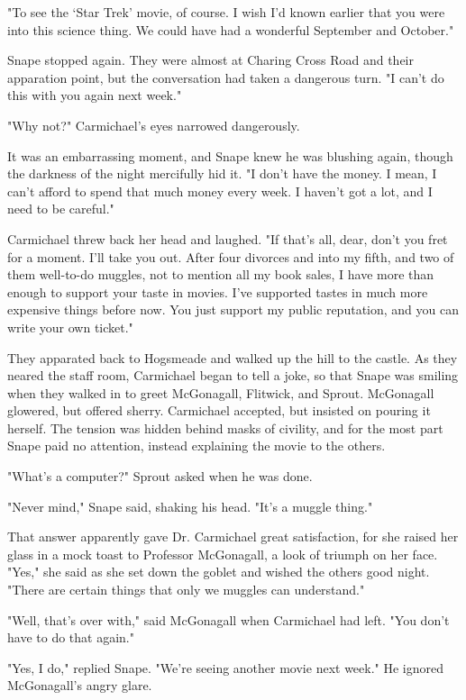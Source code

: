 \documentclass[a4paper,11pt]{article}
\begin{document}
"To see the `Star Trek' movie, of course. I wish I'd known earlier that you were into this science thing. We could have had a wonderful September and October."

Snape stopped again. They were almost at Charing Cross Road and their apparation point, but the conversation had taken a dangerous turn. "I can't do this with you again next week."

"Why not?" Carmichael's eyes narrowed dangerously.

It was an embarrassing moment, and Snape knew he was blushing again, though the darkness of the night mercifully hid it. "I don't have the money. I mean, I can't afford to spend that much money every week. I haven't got a lot, and I need to be careful."

Carmichael threw back her head and laughed. "If that's all, dear, don't you fret for a moment. I'll take you out. After four divorces and into my fifth, and two of them well-to-do muggles, not to mention all my book sales, I have more than enough to support your taste in movies. I've supported tastes in much more expensive things before now. You just support my public reputation, and you can write your own ticket."

They apparated back to Hogsmeade and walked up the hill to the castle. As they neared the staff room, Carmichael began to tell a joke, so that Snape was smiling when they walked in to greet McGonagall, Flitwick, and Sprout. McGonagall glowered, but offered sherry. Carmichael accepted, but insisted on pouring it herself. The tension was hidden behind masks of civility, and for the most part Snape paid no attention, instead explaining the movie to the others.

"What's a computer?" Sprout asked when he was done.

"Never mind," Snape said, shaking his head. "It's a muggle thing."

That answer apparently gave Dr. Carmichael great satisfaction, for she raised her glass in a mock toast to Professor McGonagall, a look of triumph on her face. "Yes," she said as she set down the goblet and wished the others good night. "There are certain things that only we muggles can understand."

"Well, that's over with," said McGonagall when Carmichael had left. "You don't have to do that again."

"Yes, I do," replied Snape. "We're seeing another movie next week." He ignored McGonagall's angry glare.
\end{document}
